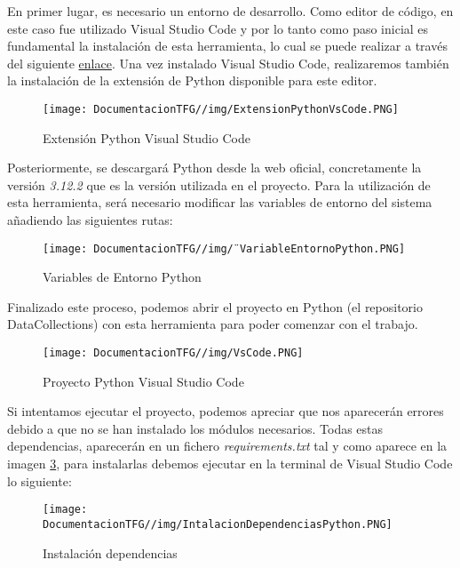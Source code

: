 En primer lugar, es necesario un entorno de desarrollo. Como editor de código, en este caso fue utilizado Visual Studio Code y por lo tanto como paso inicial es fundamental la instalación de esta herramienta, lo cual se puede realizar a través del siguiente \href{https://code.visualstudio.com/download}{enlace}. Una vez instalado Visual Studio Code, realizaremos también la instalación de la extensión de Python disponible para este editor.

\begin{figure}[H]
    \centering
    \texttt{[image: DocumentacionTFG//img/ExtensionPythonVsCode.PNG]}
    \caption{Extensión Python Visual Studio Code}
    \label{fig:enter-label}
\end{figure}

Posteriormente, se descargará Python desde la web oficial, concretamente la versión \textit{3.12.2} que es la versión utilizada en el proyecto. Para la utilización de esta herramienta, será necesario modificar las variables de entorno del sistema añadiendo las siguientes rutas:

\begin{figure}[H]
    \centering
    \texttt{[image: DocumentacionTFG//img/¨VariableEntornoPython.PNG]}
    \caption{Variables de Entorno Python}
    \label{fig:enter-label}
\end{figure}


Finalizado este proceso, podemos abrir el proyecto en Python (el repositorio DataCollections) con esta herramienta para poder comenzar con el trabajo.

\begin{figure}[H]
    \centering
    \texttt{[image: DocumentacionTFG//img/VsCode.PNG]}
    \caption{Proyecto Python Visual Studio Code}
    \label{fig:proyecto-vscode}
\end{figure}

Si intentamos ejecutar el proyecto, podemos apreciar que nos aparecerán errores debido a que no se han instalado los módulos necesarios. Todas estas dependencias, aparecerán en un fichero \textit{requirements.txt} tal y como aparece en la imagen \ref{fig:proyecto-vscode}, para instalarlas debemos ejecutar en la terminal de Visual Studio Code lo siguiente:

\begin{figure}[H]
    \centering
    \texttt{[image: DocumentacionTFG//img/IntalacionDependenciasPython.PNG]}
    \caption{Instalación dependencias}
\end{figure}

